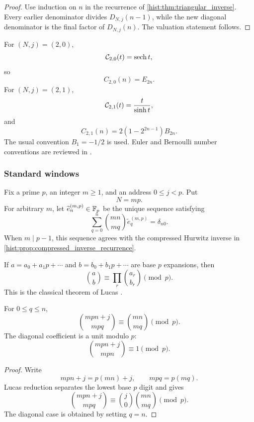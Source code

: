 \begin{proof}
Use induction on \(n\) in the recurrence of \cref{hist:thm:triangular_inverse}. Every earlier denominator divides \(D_{N,j}(n-1)\), while the new diagonal denominator is the final factor of \(D_{N,j}(n)\). The valuation statement follows.
\end{proof}

\begin{histexample}\label{hist:ex:euler_bernoulli_boundaries}
For \((N,j)=(2,0)\),
\[
\mathcal C_{2,0}(t)=\operatorname{sech}t,
\]
so
\[
C_{2,0}(n)=E_{2n}.
\]
For \((N,j)=(2,1)\),
\[
\mathcal C_{2,1}(t)=\frac{t}{\sinh t},
\]
and
\[
C_{2,1}(n)
=
2\left(1-2^{2n-1}\right)B_{2n}.
\]
The usual convention \(B_1=-1/2\) is used. Euler and Bernoulli number conventions are reviewed in \cite{Comtet1974,Stanley2012}.
\end{histexample}

\subsubsection{Standard windows}

Fix a prime \(p\), an integer \(m\geq1\), and an address \(0\leq j<p\). Put
\[
N=mp.
\]
For arbitrary \(m\), let \(\widetilde e_n^{(m,p)}\in\mathbb F_p\) be the unique sequence satisfying
\[
\boxed{
\sum_{q=0}^{n}
\binom{mn}{mq}
\widetilde e_q^{(m,p)}
=
\delta_{n0}.
}
\]
When \(m\mid p-1\), this sequence agrees with the compressed Hurwitz inverse in \cref{hist:prop:compressed_inverse_recurrence}.

\begin{histstandardfact}\label{hist:fact:lucas}
If \(a=a_0+a_1p+\cdots\) and \(b=b_0+b_1p+\cdots\) are base \(p\) expansions, then
\[
\binom ab
\equiv
\prod_r\binom{a_r}{b_r}
\pmod p.
\]
This is the classical theorem of Lucas \cite{Lucas1878a}.
\end{histstandardfact}

\begin{histtheorem}\label{hist:thm:standard_window_reduction}
For \(0\leq q\leq n\),
\[
\boxed{
\binom{mpn+j}{mpq}
\equiv
\binom{mn}{mq}
\pmod p.
}
\]
The diagonal coefficient is a unit modulo \(p\):
\[
\binom{mpn+j}{mpn}
\equiv1
\pmod p.
\]
\end{histtheorem}

\begin{proof}
Write
\[
mpn+j=p(mn)+j,
\qquad
mpq=p(mq).
\]
Lucas reduction separates the lowest base \(p\) digit and gives
\[
\binom{mpn+j}{mpq}
\equiv
\binom j0
\binom{mn}{mq}
\pmod p.
\]
The diagonal case is obtained by setting \(q=n\).
\end{proof}

